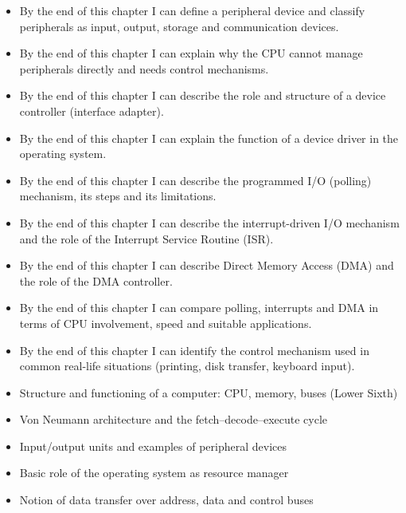\documentclass[11pt]{article}
\begin{document}
\begin{objectifs}
\begin{itemize}
\item By the end of this chapter I can define a peripheral device and classify peripherals as input, output, storage and communication devices.
\item By the end of this chapter I can explain why the CPU cannot manage peripherals directly and needs control mechanisms.
\item By the end of this chapter I can describe the role and structure of a device controller (interface adapter).
\item By the end of this chapter I can explain the function of a device driver in the operating system.
\item By the end of this chapter I can describe the programmed I/O (polling) mechanism, its steps and its limitations.
\item By the end of this chapter I can describe the interrupt-driven I/O mechanism and the role of the Interrupt Service Routine (ISR).
\item By the end of this chapter I can describe Direct Memory Access (DMA) and the role of the DMA controller.
\item By the end of this chapter I can compare polling, interrupts and DMA in terms of CPU involvement, speed and suitable applications.
\item By the end of this chapter I can identify the control mechanism used in common real-life situations (printing, disk transfer, keyboard input).
\end{itemize}
\end{objectifs}

\begin{prerequis}
\begin{itemize}
\item Structure and functioning of a computer: CPU, memory, buses (Lower Sixth)
\item Von Neumann architecture and the fetch–decode–execute cycle
\item Input/output units and examples of peripheral devices
\item Basic role of the operating system as resource manager
\item Notion of data transfer over address, data and control buses
\end{itemize}
\end{prerequis}

\newpage
\end{document}
